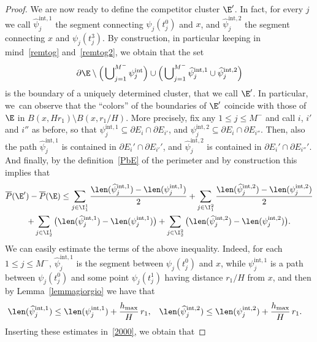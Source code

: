 \begin{proof}
We are now ready to define the competitor cluster $\E'$. In fact, for every $j$ we call $\widehat\psi_j^{\mathrm{int}, 1}$ the segment connecting $\psi_j(t^0_j)$ and $x$, and $\widehat\psi_j^{\mathrm{int}, 2}$ the segment connecting $x$ and $\psi_j(t^3_j)$. By construction, in particular keeping in mind~\eqref{remtog} and~\eqref{remtog2}, we obtain that the set
\[
\partial\E \setminus \Big( \bigcup\nolimits_{j=1}^{M^-} \psi_j^{\mathrm{int}}\Big) \cup \Big( \bigcup\nolimits_{j=1}^{M^-} \widehat\psi_j^{\mathrm{int}, 1}\cup \widehat\psi_j^{\mathrm{int}, 2}\Big)
\]
is the boundary of a uniquely determined cluster, that we call $\E'$. In particular, we~can observe that the ``colors'' of the boundaries of $\E'$ coincide with those of $\E$ in $B(x,Hr_1)\setminus B(x,r_1/H)$. More precisely, fix any $1\leq j \leq M^-$ and call $i$, $i'$ and $i''$ as before, so that $\psi_j^{\mathrm{int},1}\subseteq\partial E_i \cap \partial E_{i'}$, and $\psi_j^{\mathrm{int},2}\subseteq\partial E_i \cap \partial E_{i''}$. Then, also the path $\widehat\psi_j^{\mathrm{int},1}$ is contained in $\partial E_i'\cap \partial E_{i'}'$, and $\widehat\psi_j^{\mathrm{int},2}$ is contained in $\partial E_i'\cap \partial E_{i''}'$. And finally, by the definition~\eqref{PbE} of the perimeter and by construction this implies that
\begin{multline}\label{2000}
\overline P(\E')- \overline P(\E) \leq
\sum_{j\in\I^1_1} \frac{\len(\widehat\psi_j^{\mathrm{int},1})- \len(\psi_j^{\mathrm{int},1})}2 +
\sum_{j\in\I^2_1} \frac{\len(\widehat\psi_j^{\mathrm{int},2})- \len(\psi_j^{\mathrm{int},2})}2\\
+\sum_{j\in\I^1_2} \big(\len(\widehat\psi_j^{\mathrm{int},1})- \len(\psi_j^{\mathrm{int},1})\big) +
\sum_{j\in\I^2_2} \big(\len(\widehat\psi_j^{\mathrm{int},2})- \len(\psi_j^{\mathrm{int},2})\big).
\end{multline}
We can easily estimate the terms of the above inequality. Indeed, for each $1\leq j\leq M^-$, $\widehat\psi_j^{\mathrm{int},1}$ is the segment between $\psi_j(t^0_j)$ and $x$, while $\psi_j^{\mathrm{int},1}$ is a path between $\psi_j(t^0_j)$ and some point $\psi_j(t^1_j)$ having distance $r_1/H$ from $x$, and then by Lemma~\ref{lemmagiorgio} we have that
\begin{align*}
\len(\widehat\psi_j^{\mathrm{int},1})\leq \len(\psi_j^{\mathrm{int},1}) + \frac{h_{\max}}H\, r_1 , &&
\len(\widehat\psi_j^{\mathrm{int},2})&\leq \len(\psi_j^{\mathrm{int},2})+ \frac{h_{\max}}H\, r_1 .
\end{align*}
Inserting these estimates in~\eqref{2000}, we obtain that

\end{proof}

